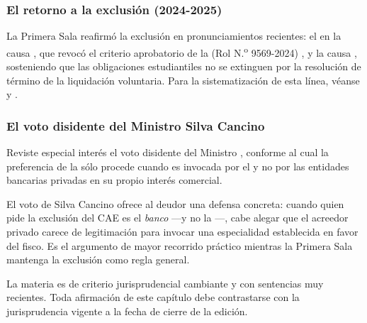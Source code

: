 \subsubsection{El retorno a la exclusión (2024-2025)}

La Primera Sala reafirmó la exclusión en pronunciamientos recientes: el  en la causa , que revocó el criterio
aprobatorio de la  (Rol N.\textsuperscript{o} 9569-2024)
\parencite{juris-cs-47641-2024-reemplazo}, y la causa 
\parencite{juris-cs-3557-2025}, sosteniendo que las obligaciones estudiantiles no se extinguen
por la resolución de término de la liquidación voluntaria. Para la sistematización de esta
línea, véanse \textcite{doc-cae-jurisprudencia} y \textcite{doc-cae-castro}.

\subsubsection{El voto disidente del Ministro Silva Cancino}

Reviste especial interés el voto disidente del Ministro ,
conforme al cual la preferencia de la \Lcae{} sólo procede cuando es invocada por el
 y no por las entidades bancarias privadas en su propio
interés comercial.

\begin{foco}
El voto de Silva Cancino ofrece al deudor una defensa concreta: cuando quien pide la exclusión
del CAE es el \emph{banco} ---y no la \tgr{}---, cabe alegar que el acreedor privado carece de
legitimación para invocar una especialidad establecida en favor del fisco. Es el argumento de
mayor recorrido práctico mientras la Primera Sala mantenga la exclusión como regla general.
\end{foco}

\begin{alerta}
La materia es de criterio jurisprudencial cambiante y con sentencias muy recientes. Toda
afirmación de este capítulo debe contrastarse con la jurisprudencia vigente a la fecha de
cierre de la edición.
\end{alerta}
